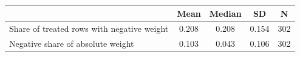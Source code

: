 \begin{tabular}{lcccc}
\toprule
 & Mean & Median & SD & N \\
\midrule
Share of treated rows with negative weight & 0.208 & 0.208 & 0.154 & 302 \\
Negative share of absolute weight & 0.103 & 0.043 & 0.106 & 302 \\
\bottomrule
\end{tabular}
